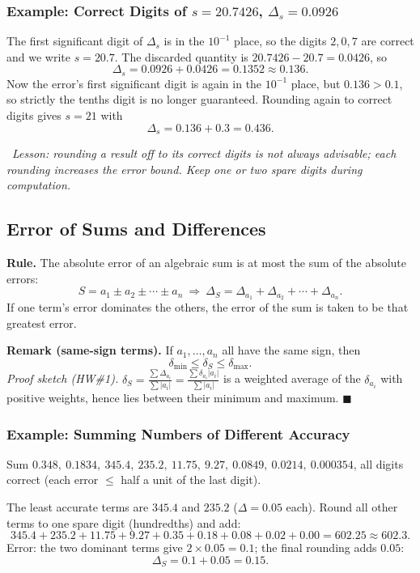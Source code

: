 \documentclass[hidelinks]{article}
\newcommand{\callout}[1]{\par\smallskip\noindent{\color{capri}$\blacktriangleright$}\ \textit{#1}\par\smallskip}
\newcommand{\abs}[1]{\left|#1\right|}
\begin{document}
\subsubsection{Example: Correct Digits of $s=20.7426$, $\Delta_s=0.0926$}

The first significant digit of $\Delta_s$ is in the $10^{-1}$ place, so the digits $2,0,7$ are correct and we write $s=20.7$. The discarded quantity is $20.7426-20.7=0.0426$, so
\[
\Delta_s=0.0926+0.0426=0.1352\approx0.136.
\]
Now the error's first significant digit is again in the $10^{-1}$ place, but $0.136>0.1$, so strictly the tenths digit is no longer guaranteed. Rounding again to correct digits gives $s=21$ with
\[
\Delta_s=0.136+0.3=0.436.
\]

\callout{Lesson: rounding a result off to its correct digits is \emph{not always advisable}; each rounding increases the error bound. Keep one or two spare digits during computation.}

\subsection{Error of Sums and Differences}

\textbf{Rule.} The absolute error of an algebraic sum is at most the sum of the absolute errors:
\[
S=a_1\pm a_2\pm\cdots\pm a_n\ \Longrightarrow\ \Delta_S=\Delta_{a_1}+\Delta_{a_2}+\cdots+\Delta_{a_n}.
\]
If one term's error dominates the others, the error of the sum is taken to be that greatest error.

\textbf{Remark (same-sign terms).} If $a_1,\dots,a_n$ all have the same sign, then
\[
\delta_{\min}\le\delta_S\le\delta_{\max}.
\]
\emph{Proof sketch (HW\#1).} $\delta_S=\frac{\sum\Delta_{a_i}}{\sum\abs{a_i}}=\frac{\sum\delta_{a_i}\abs{a_i}}{\sum\abs{a_i}}$ is a weighted average of the $\delta_{a_i}$ with positive weights, hence lies between their minimum and maximum. $\blacksquare$

\subsubsection{Example: Summing Numbers of Different Accuracy}

Sum $0.348,\ 0.1834,\ 345.4,\ 235.2,\ 11.75,\ 9.27,\ 0.0849,\ 0.0214,\ 0.000354$, all digits correct (each error $\le$ half a unit of the last digit).

The least accurate terms are $345.4$ and $235.2$ ($\Delta=0.05$ each). Round all other terms to one spare digit (hundredths) and add:
\[
345.4+235.2+11.75+9.27+0.35+0.18+0.08+0.02+0.00=602.25\approx602.3.
\]
Error: the two dominant terms give $2\times0.05=0.1$; the final rounding adds $0.05$:
\[
\Delta_S=0.1+0.05=0.15.
\]
\end{document}
